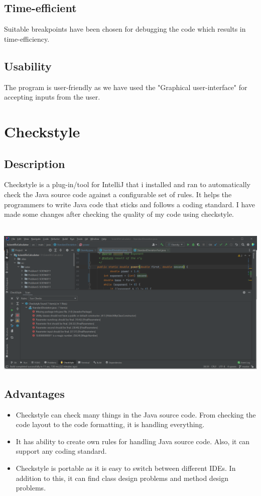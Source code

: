 \documentclass[12pt,letterpaper]{report}
\begin{document}
\section{Time-efficient}
Suitable breakpoints have been chosen for debugging the code which results in time-efficiency.

\section{Usability}
The program is user-friendly as we have used the "Graphical user-interface" for accepting inputs from the user.


\chapter{Checkstyle}

\section{Description}
Checkstyle is a plug-in/tool for IntelliJ that i installed and ran to automatically check the Java source code  against a configurable set of rules. It helps the programmers to write Java code that sticks and follows a coding standard. I have made some changes after checking the quality of my code
using checkstyle.
\\\\
\begin{center}
\includegraphics[width=14cm,height=7cm]{checkstyle}
\end{center}

\section{Advantages}

\begin{itemize}
    \item Checkstyle can check many things in the Java source code. From checking the code layout to the code formatting, it is handling everything.
    \item It has ability to create own rules for handling Java source code. Also, it can support any coding standard.
    \item Checkstyle is portable as it is easy to switch between different IDEs. In addition to this, it can find class design problems and method design problems.

\end{itemize}
\end{document}
